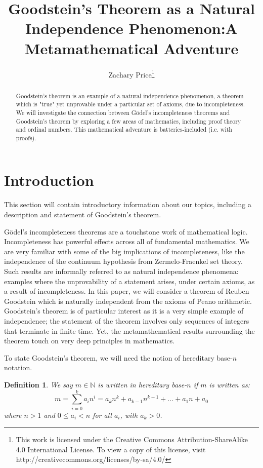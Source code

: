 \documentclass[10pt]{article}
\title{Goodstein's Theorem as a Natural Independence Phenomenon:\newline A Metamathematical Adventure}
\author{Zachary Price\footnote { 
\ccbysa \indent This work is licensed under the Creative Commons Attribution-ShareAlike 4.0 International License. To view a copy of this license, visit http://creativecommons.org/licenses/by-sa/4.0/
}}
\newcommand{\N}{\mathbb{N}}
\begin{document}
\maketitle

\newtheorem{define}{Definition}
\newtheorem{thm}{Theorem}
\newtheorem{lem}{Lemma}
\newtheorem{conj}{Conjecture}

\begin{abstract}
Goodstein's theorem is an example of a natural independence phenomenon, a theorem which is "true" yet unprovable under a particular set of axioms, due to incompleteness.
We will investigate the connection between G{\"o}del's incompleteness theorems and Goodstein's theorem by exploring a few areas of mathematics, including proof theory and ordinal numbers.
This mathematical adventure is batteries-included (i.e. with proofs).
\end{abstract}

\section{Introduction}
This section will contain introductory information about our topics, including a description and statement of Goodstein's theorem.

G{\"o}del's incompleteness theorems are a touchstone work of mathematical logic. Incompleteness has powerful effects across all of fundamental mathematics.
We are very familiar with some of the big implications of incompleteness, like the independence of the continuum hypothesis from Zermelo-Fraenkel set theory.
Such results are informally referred to as natural independence phenomena: examples where the unprovability of a statement arises, under certain axioms, as a result of incompleteness.
In this paper, we will consider a theorem of Reuben Goodstein which is naturally independent from the axioms of Peano arithmetic.
Goodstein's theorem is of particular interest as it is a very simple example of independence; the statement of the theorem involves only sequences of integers that terminate in finite time.
Yet, the metamathematical results surrounding the theorem touch on very deep principles in mathematics.

To state Goodstein's theorem, we will need the notion of hereditary base-$n$ notation.

\begin{define}
We say $m\in\N$ is written in \emph{hereditary base-$n$} if $m$ is written as:
$$m = \sum_{i=0}^{k} a_in^i = a_kn^k + a_{k-1}n^{k-1} + ... + a_1n + a_0$$
where $n>1$ and $0\leq a_i < n$	for all $a_i$, with $a_k>0$.
\end{define}
\end{document}
